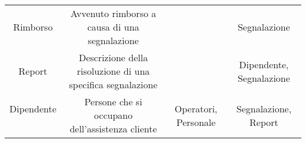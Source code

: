 \begin{center}
\begin{tabular}{ |c|c|c|c|}
\multirow{3}{6em}{Rimborso} & \multirow{3}{12em}{Avvenuto rimborso a causa di una segnalazione} & \multirow{3}{8em}{} & \multirow{3}{12em}{Segnalazione} \\
&  &  & \\
&  &  & \\ 
\hline

\multirow{3}{6em}{Report} & \multirow{3}{12em}{Descrizione della risoluzione di una specifica segnalazione} & \multirow{3}{8em}{} & \multirow{3}{12em}{Dipendente, Segnalazione} \\
&  &  & \\
&  &  & \\ 
\hline

\multirow{0}{6em}{Dipendente} & \multirow{3}{12em}{Persone che si occupano dell'assistenza cliente} & \multirow{3}{8em}{Operatori, Personale} & \multirow{3}{12em}{Segnalazione, Report} \\
&  &  & \\
&  &  & \\ 
\hline

\end{tabular}
\end{center}